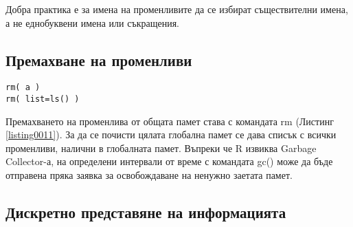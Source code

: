 Добра практика е за имена на променливите да се избират съществителни имена, а не еднобуквени имена или съкращения.

\subsection{Премахване на променливи}

\begin{lstlisting}[caption=Премахване на променливи от глобалната памет, label=listing0011]
rm( a )
rm( list=ls() )
\end{lstlisting}

Премахването на променлива от общата памет става с командата rm (Листинг \ref{listing0011}). За да се почисти цялата глобална памет се дава списък с всички променливи, налични в глобалната памет. Въпреки че R извиква Garbage Collector-а, на определени интервали от време с командата gc() може да бъде отправена пряка заявка за освобождаване на ненужно заетата памет.

\subsection{Дискретно представяне на информацията}

